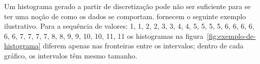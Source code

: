 \documentclass[12pt,a4paper]{article}
\begin{document}
Um histograma gerado a partir de discretização pode não ser suficiente para se ter uma noção de como os dados se comportam.  fornecem o seguinte exemplo ilustrativo. Para a sequência de valores: 1, 1, 2, 2, 3, 3, 4, 4, 5, 5, 5, 5, 6, 6, 6, 6, 6, 6, 7, 7, 7, 7, 8, 8, 9, 9, 10, 10, 11, 11 os histogramas na figura~\ref{fig:exemplo-de-histograma} diferem apenas nas fronteiras entre os intervalos; dentro de cada gráfico, os intervalos têm mesmo tamanho.

\begin{figure}[ht]
  \centering
\end{figure}
\end{document}
